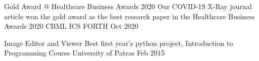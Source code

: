 



\begin{cvhonors}

  \cvhonor
    {Gold Award @ Healthcare Business Awards 2020} %
    {Our COVID-19 X-Ray journal article \cite{tsiknakisinterpretable} won the gold award as the best research paper in the Healthcare Business Awards 2020} %
    {CBML ICS FORTH} %
    {Oct 2020} %

  \cvhonor
    {Image Editor and Viewer} %
    {Best first year's python project, Introduction to Programming Course} %
    {University of Patras} %
    {Feb 2015} %

\end{cvhonors}